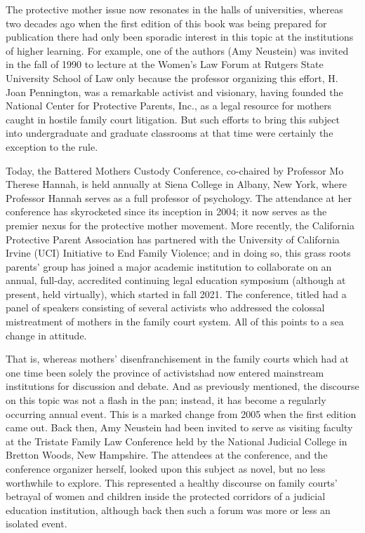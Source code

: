 
\noindent{}The protective mother issue now resonates in the halls of universities, whereas two decades ago when the first edition of this book was
being prepared for publication there had only been sporadic interest in this 
topic at the institutions of higher learning. For example, one of the authors 
(Amy Neustein) was invited
in the fall of 1990 to lecture at the Women's Law Forum at Rutgers State
University School of Law only because the professor organizing this
effort, H. Joan Pennington, was a remarkable activist and visionary, having founded the National Center for Protective Parents, Inc., as a legal
resource for mothers caught in hostile family court litigation. But such
efforts to bring this subject into undergraduate and graduate classrooms
at that time were certainly the exception to the rule. \pfl{}

Today, the Battered Mothers Custody Conference, co-chaired by Professor Mo Therese Hannah, is held annually at Siena College in Albany,
New York, where Professor Hannah serves as a full professor of psychology.
The attendance at her conference has skyrocketed since
its inception in 2004; it now serves as the premier nexus for the 
protective mother movement. More recently, the California Protective Parent
Association has partnered with the University of California Irvine (UCI)
Initiative to End Family Violence; and in doing so, this grass roots
parents' group has joined a major academic institution to collaborate
on an annual, full-day, accredited continuing legal education 
symposium (although at present, held virtually), which started in fall 2021. The
conference, titled \hspace{1pt} had a panel of speakers consisting
of several activists who addressed the colossal mistreatment of mothers
in the family court system. All of this points to a sea change in attitude. \pfl{}

\vspace{-1.4em}
That is, whereas mothers' disenfranchisement in the family courts\mdash{}
which had at one time been solely the province of activists\mdash{}had now
entered mainstream institutions for discussion and debate. And as
previously mentioned, the discourse on this topic was not a flash in the
pan; instead, it has become a regularly occurring annual event. This is
a marked change from 2005 when the first edition came out. Back then,
Amy Neustein had been invited to serve as visiting faculty at the
Tristate Family Law Conference held by the National Judicial College
in Bretton Woods, New Hampshire. The attendees at the conference,
and the conference organizer herself, looked upon this subject as novel,
but no less worthwhile to explore. This represented a healthy discourse
on family courts' betrayal of women and children inside the protected
corridors of a judicial education institution, although back then such a
forum was more or less an isolated event. \pfl{}

